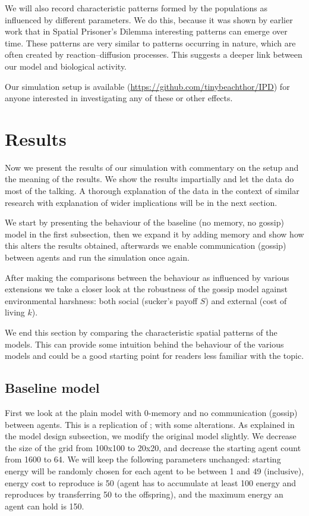 \documentclass[english]{article}
\begin{document}
We will also record characteristic patterns formed by the populations as influenced by different parameters.
We do this, because it was shown by earlier work \citep{spatial-patterns} that in Spatial Prisoner's Dilemma interesting patterns can emerge over time.
These patterns are very similar to patterns occurring in nature, which are often created by reaction--diffusion processes.
This suggests a deeper link between our model and biological activity.

Our simulation setup is available
(\url{https://github.com/tinybeachthor/IPD})
for anyone interested in investigating any of these or other effects.



\section{Results}
Now we present the results of our simulation
with commentary on the setup and the meaning of the results.
We show the results impartially and let the data do most of the talking.
A thorough explanation of the data in the context of similar research
with explanation of wider implications will be in the next section.

We start by presenting the behaviour of the baseline (no memory, no gossip) model in the first subsection,
then we expand it by adding memory and show how this alters the results obtained,
afterwards we enable communication (gossip) between agents and run the simulation once again.

After making the comparisons between the behaviour as influenced by various extensions we take a closer look at the robustness of the gossip model against environmental harshness: both social (sucker's payoff $S$) and external (cost of living $k$).

We end this section by comparing the characteristic spatial patterns of the models.
This can provide some intuition behind the behaviour of the various models and
could be a good starting point for readers less familiar with the topic.


\subsection{Baseline model}
First we look at the plain model with 0-memory and no communication (gossip) between agents.
This is a replication of \citet{smaldino}; with some alterations.
As explained in the model design subsection, we modify the original model slightly.
We decrease the size of the grid from 100x100 to 20x20,
and decrease the starting agent count from 1600 to 64.
We will keep the following parameters unchanged:
starting energy will be randomly chosen for each agent to be between 1 and 49 (inclusive),
energy cost to reproduce is 50 (agent has to accumulate at least 100 energy and reproduces by transferring 50 to the offspring),
and the maximum energy an agent can hold is 150.
\end{document}
